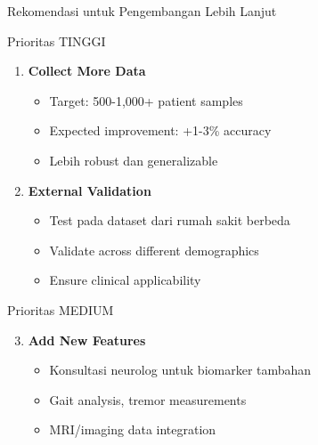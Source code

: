 \documentclass[aspectratio=169]{beamer}
\begin{document}
\begin{frame}{Rekomendasi untuk Pengembangan Lebih Lanjut}
\begin{block}{Prioritas TINGGI}
\begin{enumerate}
    \item \textbf{Collect More Data}
    \begin{itemize}
        \item Target: 500-1,000+ patient samples
        \item Expected improvement: +1-3\% accuracy
        \item Lebih robust dan generalizable
    \end{itemize}
    
    \item \textbf{External Validation}
    \begin{itemize}
        \item Test pada dataset dari rumah sakit berbeda
        \item Validate across different demographics
        \item Ensure clinical applicability
    \end{itemize}
\end{enumerate}
\end{block}

\begin{block}{Prioritas MEDIUM}
\begin{enumerate}
    \setcounter{enumi}{2}
    \item \textbf{Add New Features}
    \begin{itemize}
        \item Konsultasi neurolog untuk biomarker tambahan
        \item Gait analysis, tremor measurements
        \item MRI/imaging data integration
    \end{itemize}
\end{enumerate}
\end{block}
\end{frame}
\end{document}
